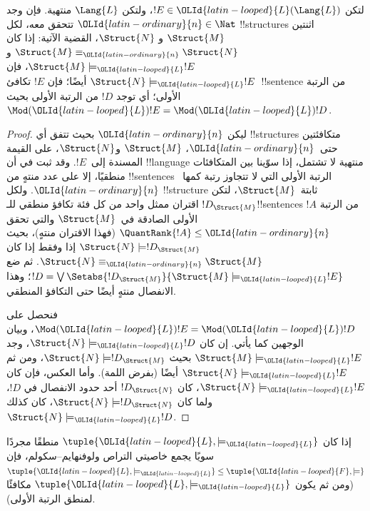 \documentclass[../../../include/open-logic-section]{subfiles}
\begin{document}


\begin{lem}
لتكن $!E \in {\OLId{latin-looped}{L}}(\Lang{L})$، ولتكن $\Lang{L}$ منتهية. فإن
وجد ${\OLId{latin-ordinary}{n}} \in \Nat$ تتحقق معه، لكل !!{structure}s اثنتين $\Struct{M}$ و
$\Struct{N}$، القضية الآتية: إذا كان $\Struct{M} \equiv_{\OLId{latin-ordinary}{n}} \Struct{N}$ و
$\Struct{M} \models_{\OLId{latin-looped}{L}} !E$، فإن $\Struct{N} \models_{\OLId{latin-looped}{L}} !E$ أيضًا؛
فإن $!E$ تكافئ~!!{sentence} من الرتبة الأولى؛ أي توجد $!D$ من الرتبة
الأولى بحيث $\Mod({\OLId{latin-looped}{L}}){!E}=\Mod({\OLId{latin-looped}{L}}){!D}$.
\end{lem}

\begin{proof}
ليكن ${\OLId{latin-ordinary}{n}}$ بحيث تتفق أي !!{structure}s متكافئتين حتى~${\OLId{latin-ordinary}{n}}$، $\Struct{M}$
و$\Struct{N}$، على القيمة المسندة إلى~$!E$. وقد ثبت في
 أن !!{language} منتهية لا تشتمل، إذا سوّينا بين المتكافئات
منطقيًا، إلا على عدد منتهٍ من !!{sentence}s الرتبة الأولى التي لا
تتجاوز رتبة كمها~${\OLId{latin-ordinary}{n}}$. ولكل !!{structure} ثابتة~$\Struct{M}$، لتكن
$!D_{\Struct{M}}$ اقتران ممثل واحد من كل فئة تكافؤ منطقي للـ!!{sentence}s
$!A$ من الرتبة الأولى الصادقة في~$\Struct{M}$ والتي تحقق
$\QuantRank{!A} \le {\OLId{latin-ordinary}{n}}$ (فهذا الاقتران منتهٍ)، بحيث
$\Struct{N} \models !D_{\Struct{M}}$ إذا وفقط إذا كان
$\Struct{N} \equiv_{\OLId{latin-ordinary}{n}} \Struct{M}$. ثم ضع
$!D = \textstyle\bigvee
\Setabs{!D_{\Struct{M}}}{\Struct{M} \models_{\OLId{latin-looped}{L}} !E}$؛ وهذا الانفصال منتهٍ
أيضًا حتى التكافؤ المنطقي.

فنحصل على $\Mod({\OLId{latin-looped}{L}}){!E}=\Mod({\OLId{latin-looped}{L}}){!D}$، وبيان الوجهين كما يأتي. إن كان
$\Struct{N} \models_{\OLId{latin-looped}{L}} !D$، وجد $\Struct{M} \models_{\OLId{latin-looped}{L}} !E$ بحيث
$\Struct{N} \models !D_{\Struct{M}}$، ومن ثم
$\Struct{N} \models_{\OLId{latin-looped}{L}} !E$ أيضًا (بفرض اللمة). وأما العكس، فإن كان
$\Struct{N} \models_{\OLId{latin-looped}{L}} !E$، كان $!D_\Struct{N}$ أحد حدود الانفصال في
$!D$، ولما كان $\Struct{N} \models !D_\Struct{N}$، كان كذلك
$\Struct{N} \models_{\OLId{latin-looped}{L}} !D$.
\end{proof}

\begin{thm}
   إذا كان $\tuple{{\OLId{latin-looped}{L}},\models_{\OLId{latin-looped}{L}}}$ منطقًا مجردًا سويًا
  يجمع خاصيتي التراص ولوفنهايم--سكولم، فإن
  $\tuple{{\OLId{latin-looped}{L}},\models_{\OLId{latin-looped}{L}}} \le \tuple{{\OLId{latin-looped}{F}},\models}$ (ومن ثم يكون
  $\tuple{{\OLId{latin-looped}{L}},\models_{\OLId{latin-looped}{L}}}$ مكافئًا لمنطق الرتبة الأولى).
\end{thm}
\end{document}
